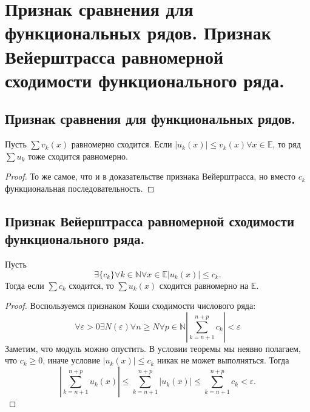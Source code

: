 \section{Признак сравнения для функциональных рядов. Признак Вейерштрасса равномерной сходимости функционального ряда.}

\subsection{Признак сравнения для функциональных рядов.}
\begin{theorem}
    Пусть $\sum v_k(x)$ равномерно сходится. Если $|u_k(x)| \leqslant v_k(x) \forall x \in \mathbb{E}$, то ряд $\sum u_k$ тоже сходится равномерно.
    \begin{proof}
        То же самое, что и в доказательстве признака Вейерштрасса, но вместо $c_k$ функциональная последовательность.
    \end{proof}
\end{theorem}

\subsection{Признак Вейерштрасса равномерной сходимости функционального ряда.}
\begin{theorem}
    Пусть
    \[
        \exists \{c_k\}
        \forall k \in \mathbb{N}
        \forall x \in \mathbb{E}
        |u_k(x)| \leqslant c_k.
    \]
    Тогда если $\sum c_k$ сходится, то $\sum u_k(x)$ сходится равномерно на $\mathbb{E}$.
    \begin{proof}
        Воспользуемся признаком Коши сходимости числового ряда:
        \[
            \forall \varepsilon > 0
            \exists N(\varepsilon)
            \forall n \geqslant N
            \forall p \in \mathbb{N}
            \left|
                \sum_{k=n+1}^{n+p} c_k
            \right| < \varepsilon
        \]
        Заметим, что модуль можно опустить. В условии теоремы мы неявно полагаем, что $c_k \geqslant 0$, иначе условие $|u_k(x)| \leqslant c_k$ никак не может выполняться. Тогда
        \[
            \left|
                \sum_{k=n+1}^{n+p} u_k(x)
            \right| \leqslant
            \sum_{k=n+1}^{n+p} |u_k(x)|
            \leqslant
            \sum_{k=n+1}^{n+p} c_k < \varepsilon.
        \]
    \end{proof}
\end{theorem}